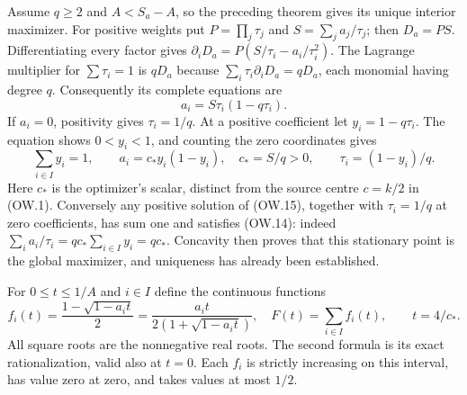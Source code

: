 \documentclass[11pt]{article}
\begin{document}
Assume $q\ge2$ and $A<S_a-A$, so the preceding theorem gives its
unique interior maximizer. For positive weights put
$P=\prod_j\tau_j$ and $S=\sum_j a_j/\tau_j$; then $D_a=PS$.
Differentiating every factor gives
$\partial_iD_a=P(S/\tau_i-a_i/\tau_i^2)$.
The Lagrange multiplier for $\sum\tau_i=1$ is $qD_a$ because
$\sum_i\tau_i\partial_iD_a=qD_a$, each monomial having degree $q$.
Consequently its complete equations are
\[
 a_i=S\tau_i(1-q\tau_i).                                \tag{OW.14}
\]
If $a_i=0$, positivity gives $\tau_i=1/q$. At a positive
coefficient let $y_i=1-q\tau_i$. The equation shows
$0<y_i<1$, and counting the zero coordinates gives
\[
 \sum_{i\in I}y_i=1,\qquad
 a_i=c_*y_i(1-y_i),\quad c_*=S/q>0,\qquad
 \tau_i=(1-y_i)/q.                                       \tag{OW.15}
\]
Here $c_*$ is the optimizer's scalar, distinct from the source centre
$c=k/2$ in (OW.1). Conversely any positive solution of (OW.15),
together with $\tau_i=1/q$ at zero coefficients, has sum one and
satisfies (OW.14): indeed
$\sum_i a_i/\tau_i=q c_*\sum_{i\in I}y_i=q c_*$.
Concavity then proves that this stationary point is the global
maximizer, and uniqueness has already been established.

For $0\le t\le1/A$ and $i\in I$ define the continuous functions
\[
 f_i(t)=\frac{1-\sqrt{1-a_it}}2
       =\frac{a_it}{2(1+\sqrt{1-a_it})},\quad
 F(t)=\sum_{i\in I}f_i(t),\qquad t=4/c_*.
 \tag{OW.16}
\]
All square roots are the nonnegative real roots. The second formula
is its exact rationalization, valid also at $t=0$.
Each $f_i$ is strictly increasing on this interval, has value zero
at zero, and takes values at most $1/2$.
\end{document}
